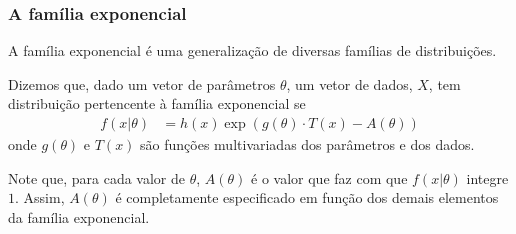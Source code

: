
\subsubsection{A família exponencial}

A família exponencial é uma generalização de 
diversas famílias de distribuições.

\begin{definition}
 \label{defn:exponential-family}
 Dizemos que, dado um vetor de parâmetros $\theta$,
 um vetor de dados, $X$, 
 tem distribuição pertencente à família exponencial se
 \begin{align*}
  f(x|\theta) 
  &= h(x) \exp\left(g(\theta) \cdot T(x)
  - A(\theta)\right)
 \end{align*}
 onde $g(\theta)$ e $T(x)$ são
 funções multivariadas dos parâmetros e dos dados.
\end{definition}

Note que, para cada valor de $\theta$,
$A(\theta)$ é o valor que faz com que
$f(x|\theta)$ integre $1$.
Assim, $A(\theta)$ é completamente especificado
em função dos demais elementos da família exponencial.

